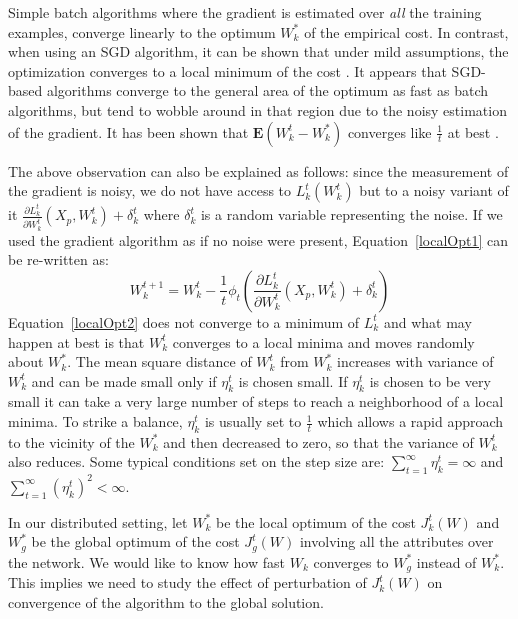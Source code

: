 Simple batch algorithms where the gradient is estimated over \emph{all} the training examples, converge linearly to the optimum $W^{*}_k$ of the empirical cost. In contrast, when using an SGD algorithm, it can be shown that under mild assumptions, the optimization converges to a local minimum of the cost \cite{bottou-98x,Benveniste_90,Bertsekas_97}. It appears that SGD-based algorithms converge to the general area of the optimum as fast as batch algorithms, but tend to wobble around in that region due to the noisy estimation of the gradient. It has been shown that $\textbf{E}(W^{t}_k - W^{*}_k)$ converges like $\frac{1}{t}$ at best \cite{Bottou_05}. 

The above observation can also be explained as follows: since the measurement of the gradient is noisy, we do not have access to $L_k^t(W^{t}_k)$ but to a noisy variant of it $\frac{\partial L_k^t }{\partial W_k^t}(X_p, W_k^t) + \delta_k^t$ where $\delta_k^t$ is a random variable representing the noise. If we used the gradient algorithm as if no noise were present, Equation~\ref{localOpt1} can be re-written as:
\begin{equation}
\label{localOpt2}
W^{t+1}_k = W^{t}_k - \frac{1}{t} \phi_t (\frac{\partial L^{t}_k }{\partial W^{t}_k}(X_p, W^{t}_k) + \delta_k^t)
\end{equation}
Equation~\ref{localOpt2} does not converge to a minimum of $L^{t}_k$ and what may happen at best is that $W^{t}_k $ converges to a local minima and moves randomly about $W^{*}_k $. The mean square distance of $W^{t}_k $ from $W^{*}_k$ increases with variance of $W^{t}_k$ and can be made small only if $\eta_k^t$ is chosen small. If $\eta_k^t$ is chosen to be very small it can take a very large number of steps to reach a neighborhood of a local minima. To strike a balance, $\eta_k^t$ is usually set to $\frac{1}{t}$ which allows a rapid approach to the vicinity of the $W^{*}_k$ and then decreased to zero, so that the variance of $W^{t}_k$ also reduces. Some typical conditions set on the step size are: $\sum_{t=1}^{\infty}\eta_k^t=\infty$ and $\sum_{t=1}^{\infty}(\eta_k^t)^2 <\infty$. 

In our distributed setting, let $W^{*}_k$ be the local optimum of the cost $J_k^t(W)$ and $W^{*}_g$ be the global optimum of the cost $J_g^t(W)$ involving all the attributes over the network. We would like to know how fast $W_k$ converges to $W^{*}_g$ instead of $W^{*}_k$. This implies we need to study the effect of perturbation of $J_k^t(W)$ on convergence of the algorithm to the global solution.

